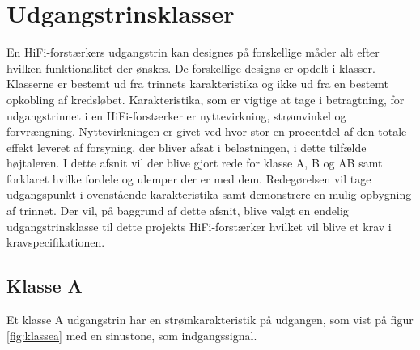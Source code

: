 \section{Udgangstrinsklasser}
\label{klasser}
En HiFi-forstærkers udgangstrin kan designes på forskellige måder alt efter hvilken funktionalitet der ønskes. De forskellige designs er opdelt i klasser. Klasserne er bestemt ud fra trinnets karakteristika og ikke ud fra en bestemt opkobling af kredsløbet. Karakteristika, som er vigtige at tage i betragtning, for udgangstrinnet i en HiFi-forstærker er nyttevirkning, strømvinkel og forvrængning. Nyttevirkningen er givet ved hvor stor en procentdel af den totale effekt leveret af forsyning, der bliver afsat i belastningen, i dette tilfælde højtaleren.
I dette afsnit vil der blive gjort rede for klasse A, B og AB samt forklaret hvilke fordele og ulemper der er med dem. Redegørelsen vil tage udgangspunkt i ovenstående karakteristika samt demonstrere en mulig opbygning af trinnet.
Der vil, på baggrund af dette afsnit, blive valgt en endelig udgangstrinsklasse til dette projekts HiFi-forstærker hvilket vil blive et krav i kravspecifikationen.

\subsection{Klasse A}

Et klasse A udgangstrin har en strømkarakteristik på udgangen, som vist på figur \ref{fig:klassea} med en sinustone, som indgangssignal. 

